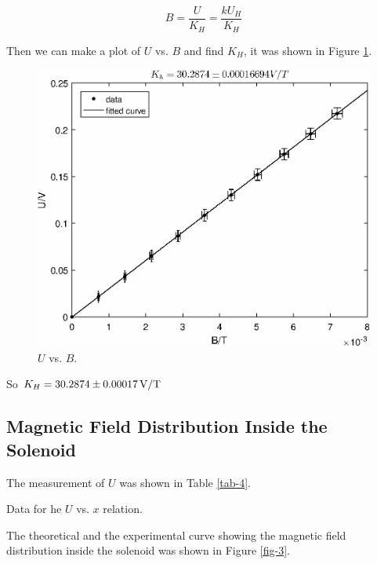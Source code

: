 \documentclass{article}
\begin{document}
$$B=\frac{U}{K_H}=\frac{kU_H}{K_H}$$

Then we can make a plot of $U$ vs. $B$ and find $K_H$, it was shown in Figure \ref{fig-2}.

\begin{figure}[H]
	\centering
	\includegraphics[scale=0.6]{fig2.eps}
	\caption{$U$ vs. $B$.}
	\label{fig-2}
\end{figure}

So $K_H=30.2874\pm0.00017\,\rm{V/T}$

\subsection{Magnetic Field Distribution Inside the Solenoid}

The measurement of $U$ was shown in Table \ref{tab-4}.

\begin{table}[!h]
\begin{center}

\caption{Data for he $U$ vs. $x$ relation.}
\label{tab-4}
\end{center}
\end{table}

The theoretical and the experimental curve showing the magnetic field distribution inside the solenoid was shown in Figure \ref{fig-3}.
\end{document}
